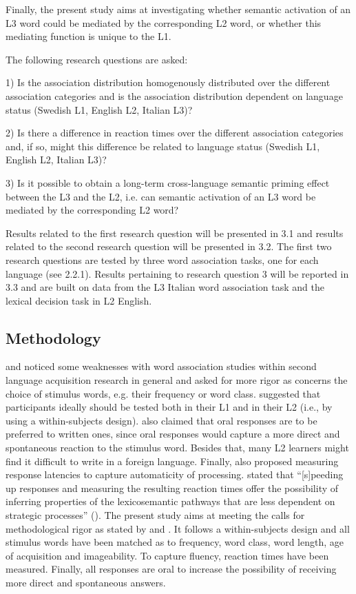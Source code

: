\documentclass[output=paper,colorlinks,citecolor=brown,nonflat]{langsci/langscibook}
\begin{document}
Finally, the present study aims at investigating whether semantic activation of an L3 word could be mediated by the corresponding L2 word, or whether this mediating function is unique to the L1.

The following research questions are asked:

1) Is the association distribution homogenously distributed over the different association categories and is the association distribution dependent on language status (Swedish L1, English L2, Italian L3)?

2) Is there a difference in reaction times over the different association categories and, if so, might this difference be related to language status (Swedish L1, English L2, Italian L3)?

3) Is it possible to obtain a long-term cross-language semantic priming effect between the L3 and the L2, i.e. can semantic activation of an L3 word be mediated by the corresponding L2 word?

Results related to the first research question will be presented in 3.1 and results related to the second research question will be presented in 3.2. The first two research questions are tested by three word association tasks, one for each language (see 2.2.1). Results pertaining to research question 3 will be reported in 3.3 and are built on data from the L3 Italian word association task and the lexical decision task in L2 English.

\subsection{Methodology}\label{sec:gudmundson:2.2}

\citet{Fitzpatrick2006} and \citet{FitzpatrickEtAl2013} noticed some weaknesses with word association studies within second language acquisition research in general and asked for more rigor as concerns the choice of stimulus words, e.g. their frequency or word class. \citet[200]{CremerEtAl2010} suggested that participants ideally should be tested both in their L1 and in their L2 (i.e., by using a within-subjects design). \citeauthor{CremerEtAl2010} also claimed that oral responses are to be preferred to written ones, since oral responses would capture a more direct and spontaneous reaction to the stimulus word. Besides that, many L2 learners might find it difficult to write in a foreign language. Finally, \citeauthor{CremerEtAl2010} also proposed measuring response latencies to capture automaticity of processing. \citeauthor{FitzpatrickIzura2011} stated that “[s]peeding up responses and measuring the resulting reaction times offer the possibility of inferring properties of the lexicosemantic pathways that are less dependent on strategic processes” (\citeyear[376]{FitzpatrickIzura2011}). The present study aims at meeting the calls for methodological rigor as stated by \citeauthor{FitzpatrickEtAl2013} and \citeauthor{CremerEtAl2010}. It follows a within-subjects design and all stimulus words have been matched as to frequency, word class, word length, age of acquisition and imageability. To capture fluency, reaction times have been measured. Finally, all responses are oral to increase the possibility of receiving more direct and spontaneous answers.
\end{document}
